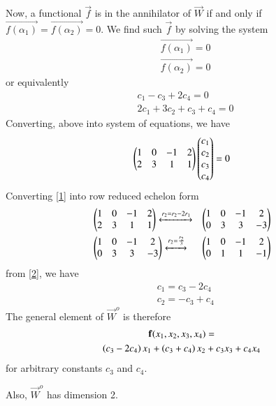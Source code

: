 \documentclass[journal,12pt,twocolumn]{IEEEtran}
\begin{document}
Now, a functional $\vec{f}$ is in the annihilator of $\vec{W}$ if and only if $\vec{f(\alpha_1)} = \vec{f(\alpha_2)} = 0$. We find such $\vec{f}$ by solving the system 
\begin{align}
& \vec{f(\alpha_1)} = 0 \\
& \vec{f(\alpha_2)} = 0
\end{align}
or equivalently
\begin{align}
& c_1 - c_3 + 2c_4 = 0 \\
& 2c_1 + 3c_2 + c_3 + c_4 = 0
\end{align}
Converting, above into system of equations, we have
\begin{align}
\begin{pmatrix}1 & 0 & -1 & 2 \\ 2 & 3 & 1 & 1\end{pmatrix}\begin{pmatrix}c_1 \\ c_2 \\ c_3 \\ c_4\end{pmatrix} = 0 \label{1}
\end{align} 
Converting \eqref{1} into row reduced echelon form
\begin{align}
& \begin{pmatrix}1 & 0 & -1 & 2 \\ 2 & 3 & 1 & 1\end{pmatrix} \xleftrightarrow[]{r_2 = r_2 - 2r_1} & \begin{pmatrix}1 & 0 & -1 & 2 \\ 0 & 3 & 3 & -3\end{pmatrix} \\
& \begin{pmatrix}1 & 0 & -1 & 2 \\ 0 & 3 & 3 & -3\end{pmatrix} \xleftrightarrow[]{r_2 = \frac{r_2}{3}} & \begin{pmatrix}1 & 0 & -1 & 2 \\ 0 & 1 & 1 & -1\end{pmatrix} \label{2}
\end{align}
from \eqref{2}, we have
\begin{align}
& c_1 = c_3 - 2c_4 \\
& c_2 = -c_3 + c_4
\end{align}
The general element of $\vec{W}^{o}$ is therefore
\begin{multline}
\mathbf{f}(x_1,x_2,x_3,x_4) =\\
\left(c_3 - 2c_4\right)x_1 + \left(c_3 + c_4\right)x_2 + c_3x_3 + c_4x_4
\end{multline}
for arbitrary constants $c_3$ and $c_4$. 

Also, $\vec{W}^{o}$ has dimension 2.
\end{document}
